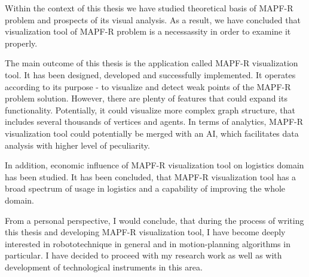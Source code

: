 \documentclass[thesis=B,english]{FITthesis}[2019/12/23]
\begin{document}
\begin{conclusion}
	
Within the context of this thesis we have studied theoretical basis of MAPF-R problem and prospects of its visual analysis. As a result, we have concluded that  visualization tool of MAPF-R problem is a necessassity in order to examine it properly.

The main outcome of this thesis is the application called MAPF-R visualization tool. It has been designed, developed and successfully implemented. It operates according to its purpose - to visualize and detect weak points of the MAPF-R problem solution.  However, there are plenty of features that could expand its functionality. Potentially, it could visualize more complex graph structure, that includes several thousands of vertices and agents. In terms of analytics, MAPF-R visualization tool could potentially be merged with an AI, which facilitates data analysis with higher level of peculiarity. 

In addition, economic influence of MAPF-R visualization tool on logistics domain has been studied. It has been concluded, that MAPF-R visualization tool has a broad spectrum of usage in logistics and a capability of improving the whole domain.

From a personal perspective, I would conclude, that during the process of writing this thesis and developing MAPF-R visualization tool, I have become deeply interested in robototechnique in general and in motion-planning algorithms in particular. I have decided to proceed with my research work as well as with development of technological instruments in this area.

\end{conclusion}



\end{document}
